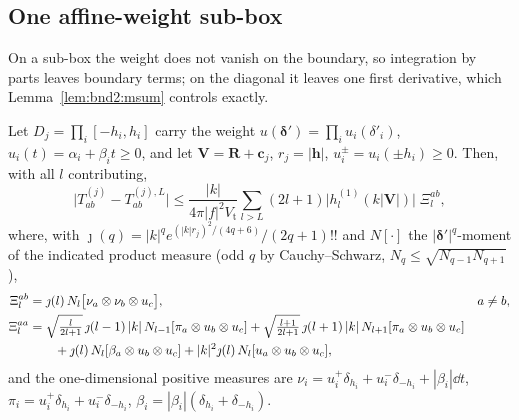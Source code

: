 \subsection{One affine-weight sub-box}
\label{sec:bnd2:sub}

On a sub-box the weight does not vanish on the boundary, so integration by parts leaves
boundary terms; on the diagonal it leaves one first derivative, which
Lemma~\ref{lem:bnd2:msum} controls exactly.

\begin{theorem}
\label{thm:bnd2:sub}
Let $D_j = \prod_i[-h_i,h_i]$ carry the weight $u(\boldsymbol{\delta}') =
\prod_i u_i(\delta'_i)$, $u_i(t) = \alpha_i+\beta_i t \ge 0$, and let
$\mathbf{V} = \mathbf{R}+\mathbf{c}_j$, $r_j = |\mathbf{h}|$,
$u_i^{\pm} = u_i(\pm h_i) \ge 0$. Then, with all $l$ contributing,
\begin{equation}
\bigl|T^{(j)}_{ab}-T^{(j),L}_{ab}\bigr| \le
\frac{|k|}{4\pi|f|^{2}V_{\mathrm{t}}}\sum_{l>L}(2l+1)\bigl|h^{(1)}_l(k|\mathbf{V}|)\bigr|
\;\Xi^{ab}_l ,
\label{eq:bnd2:sub}
\end{equation}
where, with $\jmath(q) = |k|^{q}e^{(|k|r_j)^2/(4q+6)}/(2q+1)!!$ and $N[\cdot]$ the
$|\boldsymbol{\delta}'|^{q}$-moment of the indicated product measure (odd $q$ by
Cauchy--Schwarz, $N_q \le \sqrt{N_{q-1}N_{q+1}}$),
\begin{align}
\Xi^{ab}_l &= \jmath(l)\,N_l\bigl[\nu_a\otimes\nu_b\otimes u_c\bigr], && a \ne b,\\
\Xi^{aa}_l &= \sqrt{\tfrac{l}{2l+1}}\,\jmath(l-1)\,|k|\,N_{l-1}[\pi_a\otimes u_b\otimes u_c]
+ \sqrt{\tfrac{l+1}{2l+1}}\,\jmath(l+1)\,|k|\,N_{l+1}[\pi_a\otimes u_b\otimes u_c]
\notag\\
&\qquad + \jmath(l)\,N_l[\beta_a\otimes u_b\otimes u_c]
+ |k|^2\jmath(l)\,N_l[u_a\otimes u_b\otimes u_c],
\end{align}
and the one-dimensional positive measures are
$\nu_i = u_i^{+}\delta_{h_i}+u_i^{-}\delta_{-h_i}+|\beta_i|\dd t$,
$\pi_i = u_i^{+}\delta_{h_i}+u_i^{-}\delta_{-h_i}$,
$\beta_i = |\beta_i|(\delta_{h_i}+\delta_{-h_i})$.
\end{theorem}

